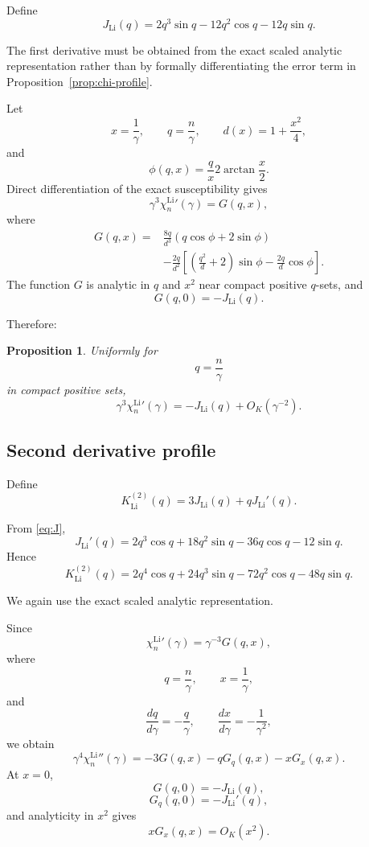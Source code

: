 \documentclass[11pt]{article}
\newtheorem{proposition}[theorem]{Proposition}
\newcommand{\LiSus}{\chi^{\mathrm{Li}}}
\begin{document}
Define
\begin{equation}
\label{eq:J}
J_{\mathrm{Li}}(q)
=
2q^3\sin q
-
12q^2\cos q
-
12q\sin q.
\end{equation}

The first derivative must be obtained from the exact scaled analytic
representation rather than by formally differentiating the error term
in Proposition~\ref{prop:chi-profile}.

Let
\[
x=\frac1\gamma,
\qquad
q=\frac n\gamma,
\qquad
d(x)=1+\frac{x^2}{4},
\]
and
\[
\phi(q,x)
=
\frac qx
2\arctan\frac x2.
\]
Direct differentiation of the exact susceptibility gives
\[
\gamma^3\LiSus_n'(\gamma)
=
G(q,x),
\]
where
\[
\begin{aligned}
G(q,x)
={}&
\frac{8q}{d^3}
\left(
q\cos\phi+2\sin\phi
\right)
\\
&-
\frac{2q}{d^2}
\left[
\left(
\frac{q^2}{d}+2
\right)
\sin\phi
-
\frac{2q}{d}\cos\phi
\right].
\end{aligned}
\]
The function \(G\) is analytic in \(q\) and \(x^2\) near compact
positive \(q\)-sets, and
\[
G(q,0)=-J_{\mathrm{Li}}(q).
\]

Therefore:

\begin{proposition}
\label{prop:first-derivative}
Uniformly for
\[
q=\frac n\gamma
\]
in compact positive sets,
\[
\gamma^3\LiSus_n'(\gamma)
=
-J_{\mathrm{Li}}(q)
+
O_K(\gamma^{-2}).
\]
\end{proposition}

\subsection{Second derivative profile}

Define
\begin{equation}
\label{eq:K2-definition}
K_{\mathrm{Li}}^{(2)}(q)
=
3J_{\mathrm{Li}}(q)
+
qJ_{\mathrm{Li}}'(q).
\end{equation}

From \eqref{eq:J},
\[
J_{\mathrm{Li}}'(q)
=
2q^3\cos q
+
18q^2\sin q
-
36q\cos q
-
12\sin q.
\]
Hence
\begin{equation}
\label{eq:K2}
\boxed{
K_{\mathrm{Li}}^{(2)}(q)
=
2q^4\cos q
+
24q^3\sin q
-
72q^2\cos q
-
48q\sin q.
}
\end{equation}

We again use the exact scaled analytic representation.

Since
\[
\LiSus_n'(\gamma)
=
\gamma^{-3}G(q,x),
\]
where
\[
q=\frac n\gamma,
\qquad
x=\frac1\gamma,
\]
and
\[
\frac{dq}{d\gamma}
=
-\frac q\gamma,
\qquad
\frac{dx}{d\gamma}
=
-\frac1{\gamma^2},
\]
we obtain
\[
\gamma^4\LiSus_n''(\gamma)
=
-3G(q,x)
-
qG_q(q,x)
-
xG_x(q,x).
\]
At \(x=0\),
\[
G(q,0)=-J_{\mathrm{Li}}(q),
\]
\[
G_q(q,0)=-J_{\mathrm{Li}}'(q),
\]
and analyticity in \(x^2\) gives
\[
xG_x(q,x)=O_K(x^2).
\]
\end{document}

